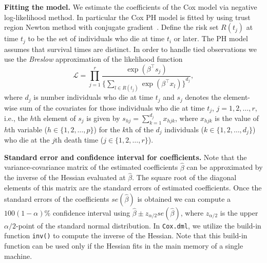 \textbf{Fitting the model.}
We estimate the coefficients of the Cox model via negative log-likelihood method.
In particular the Cox PH model is fitted by using trust region Newton method with conjugate gradient~\cite{Nocedal2006:Optimization}.
Define the risk set $R(t_j)$ at time $t_j$ to be the set of individuals who die at time $t_i$ or later. 
The PH model assumes that survival times are distinct. In order to handle tied observations
we use the \emph{Breslow} approximation of the likelihood function
\begin{equation*}
\mathcal{L}=\prod_{j=1}^{r} \frac{\exp(\beta^\top s_j)}{{\bigg\{ \sum_{l\in R(t_j)} \exp(\beta^\top x_l) \biggr\}}^{d_j}},
\end{equation*}
where $d_j$ is number individuals who die at time $t_j$ and $s_j$ denotes the element-wise sum of the covariates for those individuals who die at time $t_j$, $j=1,2,\ldots,r$, i.e.,
the $h$th element of $s_j$ is given by $s_{hj}=\sum_{k=1}^{d_j}x_{hjk}$, where $x_{hjk}$ is the value of $h$th variable ($h\in \{1,2,\ldots,p\}$) for the $k$th of the $d_j$ individuals ($k\in\{ 1,2,\ldots,d_j \}$) who die at the $j$th death time ($j\in\{ 1,2,\ldots,r \}$).  

\textbf{Standard error and confidence interval for coefficients.}
Note that the variance-covariance matrix of the estimated coefficients $\hat{\beta}$ can be approximated by the inverse of the Hessian evaluated at $\hat{\beta}$. The square root of the diagonal elements of this matrix are the standard errors of estimated coefficients.  
Once the standard errors of the coefficients $se(\hat{\beta})$ is obtained we can compute a $100(1-\alpha)\%$ confidence interval using $\hat{\beta}\pm z_{\alpha/2}se(\hat{\beta})$, where $z_{\alpha/2}$ is the upper $\alpha/2$-point of the standard normal distribution.
In {\tt Cox.dml}, we utilize the build-in function {\tt inv()} to compute the inverse of the Hessian. Note that this build-in function can be used only if the Hessian fits in the main memory of a single machine.   


